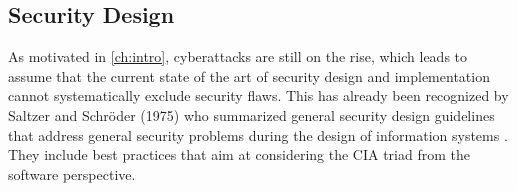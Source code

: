\subsection{Security Design} \label{subs:foundations-security-design}
As motivated in \autoref{ch:intro}, cyberattacks are still on the rise, which leads to assume that the current state of the art of security design and implementation cannot systematically exclude security flaws. This has already been recognized by Saltzer and Schröder (1975) who summarized general security design guidelines that address general security problems during the design of information systems \cite{saltzer_protection_1975}. They include best practices that aim at considering the CIA triad from the software perspective.%



